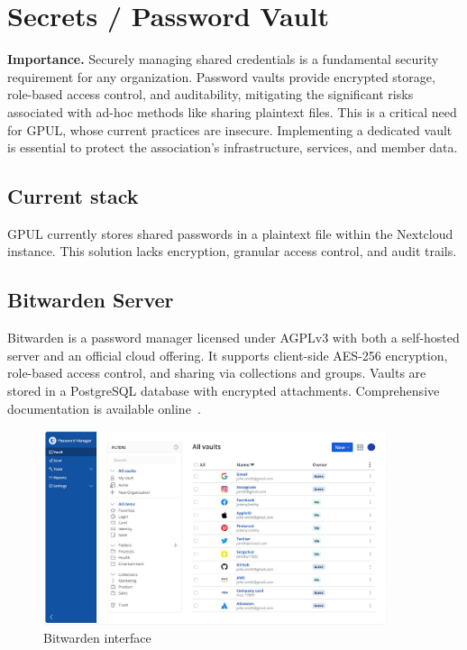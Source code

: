 \section{Secrets / Password Vault}

\textbf{Importance.} Securely managing shared credentials is a fundamental security requirement for any organization. Password vaults provide encrypted storage, role-based access control, and auditability, mitigating the significant risks associated with ad-hoc methods like sharing plaintext files. This is a critical need for GPUL, whose current practices are insecure. Implementing a dedicated vault is essential to protect the association's infrastructure, services, and member data.

\subsection*{Current stack}
GPUL currently stores shared passwords in a plaintext file within the Nextcloud instance. This solution lacks encryption, granular access control, and audit trails.

\subsection*{Bitwarden Server}
Bitwarden is a password manager licensed under AGPLv3 with both a self-hosted server and an official cloud offering. It supports client-side AES-256 encryption, role-based access control, and sharing via collections and groups. Vaults are stored in a PostgreSQL database with encrypted attachments. Comprehensive documentation is available online~\cite{bitwarden-docs}.

\begin{figure}[H]
  \centering
  \includegraphics[width=0.9\textwidth]{imaxes/bitwarden-ui.png}
  \caption{Bitwarden interface}
  \label{fig:bitwarden-ui}
\end{figure}

